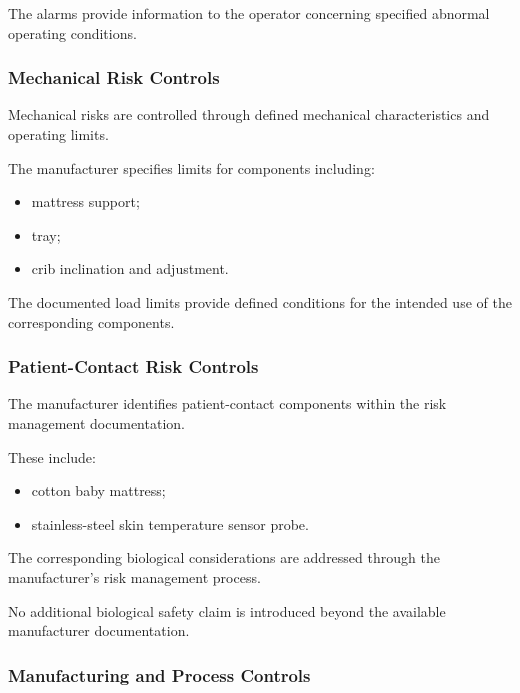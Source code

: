 The alarms provide information to the operator concerning specified
abnormal operating conditions.

\subsubsection{Mechanical Risk Controls}

Mechanical risks are controlled through defined mechanical characteristics
and operating limits.

The manufacturer specifies limits for components including:

\begin{itemize}

    \item mattress support;

    \item tray;

    \item crib inclination and adjustment.

\end{itemize}

The documented load limits provide defined conditions for the intended use
of the corresponding components.

\subsubsection{Patient-Contact Risk Controls}

The manufacturer identifies patient-contact components within the risk
management documentation.

These include:

\begin{itemize}

    \item cotton baby mattress;

    \item stainless-steel skin temperature sensor probe.

\end{itemize}

The corresponding biological considerations are addressed through the
manufacturer's risk management process.

No additional biological safety claim is introduced beyond the available
manufacturer documentation.

\subsubsection{Manufacturing and Process Controls}

